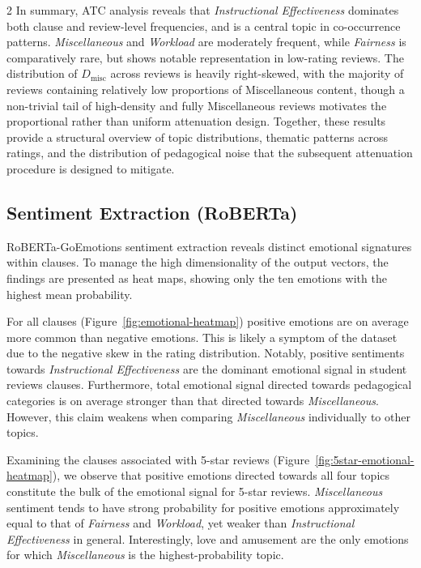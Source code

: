 \documentclass{article}
\begin{document}
\begin{multicols*}{2}
In summary, ATC analysis reveals that \textit{Instructional Effectiveness} dominates both clause and review-level frequencies, and is a central topic in co-occurrence patterns. \textit{Miscellaneous} and \textit{Workload} are moderately frequent, while \textit{Fairness} is comparatively rare, but shows notable representation in low-rating reviews. The distribution of $D_\text{misc}$ across reviews is heavily right-skewed, with the majority of reviews containing relatively low proportions of Miscellaneous content, though a non-trivial tail of high-density and fully Miscellaneous reviews motivates the proportional rather than uniform attenuation design. Together, these results provide a structural overview of topic distributions, thematic patterns across ratings, and the distribution of pedagogical noise that the subsequent attenuation procedure is designed to mitigate.

\subsection{Sentiment Extraction (RoBERTa)}
RoBERTa-GoEmotions sentiment extraction reveals distinct emotional signatures within clauses. To manage the high dimensionality of the output vectors, the findings are presented as heat maps, showing only the ten emotions with the highest mean probability.

For all clauses (Figure~\ref{fig:emotional-heatmap}) positive emotions are on average more common than negative emotions. This is likely a symptom of the dataset due to the negative skew in the rating distribution. Notably, positive sentiments towards \textit{Instructional Effectiveness} are the dominant emotional signal in student reviews clauses. Furthermore, total emotional signal directed towards pedagogical categories is on average stronger than that directed towards \textit{Miscellaneous}. However, this claim weakens when comparing \textit{Miscellaneous} individually to other topics.

Examining the clauses associated with 5-star reviews (Figure~\ref{fig:5star-emotional-heatmap}), we observe that positive emotions directed towards all four topics constitute the bulk of the emotional signal for 5-star reviews. \textit{Miscellaneous} sentiment tends to have strong probability for positive emotions approximately equal to that of \textit{Fairness} and \textit{Workload}, yet weaker than \textit{Instructional Effectiveness} in general. Interestingly, love and amusement are the only emotions for which \textit{Miscellaneous} is the highest-probability topic.


\end{multicols*}
\end{document}
